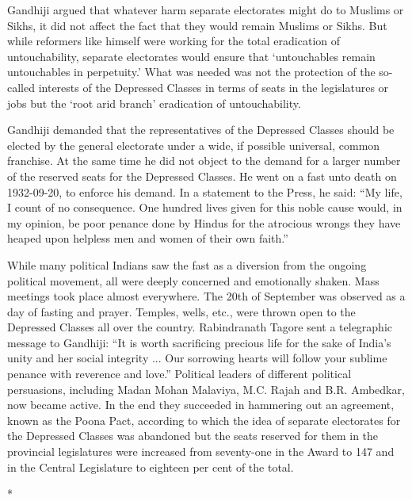 \begin{multicols}{2}
Gandhiji argued that whatever harm separate electorates might do to Muslims or Sikhs, it did not affect the fact that they would remain Muslims or Sikhs. But while reformers like himself were working for the total eradication of untouchability, separate electorates would ensure that `untouchables remain untouchables in perpetuity.' What was needed was not the protection of the so-called interests of the Depressed Classes in terms of seats in the legislatures or jobs but the `root arid branch' eradication of untouchability.

Gandhiji demanded that the representatives of the Depressed Classes should be elected by the general electorate under a wide, if possible universal, common franchise. At the same time he did not object to the demand for a larger number of the reserved seats for the Depressed Classes. He went on a fast unto death on 1932-09-20, to enforce his demand. In a statement to the Press, he said: ``My life, I count of no consequence. One hundred lives given for this noble cause would, in my opinion, be poor penance done by Hindus for the atrocious wrongs they have heaped upon helpless men and women of their own faith.''

While many political Indians saw the fast as a diversion from the ongoing political movement, all were deeply concerned and emotionally shaken. Mass meetings took place almost everywhere. The 20th of September was observed as a day of fasting and prayer. Temples, wells, etc., were thrown open to the Depressed Classes all over the country. Rabindranath Tagore sent a telegraphic message to Gandhiji: ``It is worth sacrificing precious life for the sake of India's unity and her social integrity ... Our sorrowing hearts will follow your sublime penance with reverence and love.'' Political leaders of different political persuasions, including Madan Mohan Malaviya, M.C. Rajah and B.R. Ambedkar, now became active. In the end they succeeded in hammering out an agreement, known as the Poona Pact, according to which the idea of separate electorates for the Depressed Classes was abandoned but the seats reserved for them in the provincial legislatures were increased from seventy-one in the Award to 147 and in the Central Legislature to eighteen per cent of the total.

\begin{center}*\end{center}


\end{multicols}
